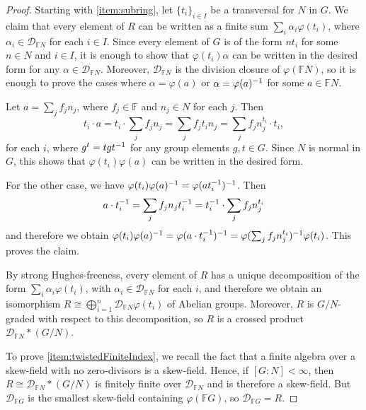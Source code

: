 \documentclass[11pt, letterpaper]{amsart}
\begin{document}
\begin{proof}

Starting with \ref{item:subring}, let $\{t_i\}_{i \in I}$ be a transversal for $N$ in $G$. We claim that every element of $R$ can be written as a finite sum $\sum_i \alpha_i \varphi(t_i)$, where $\alpha_i \in \mathcal{D}_{\mathbb{F}N}$ for each $i \in I$. Since every element of $G$ is of the  form $n t_i$ for some $n \in N$ and $i \in I$, it is enough to show that $\varphi(t_i) \alpha$ can be written in the desired form for any $\alpha \in \mathcal{D}_{\mathbb{F}N}$. Moreover, $\mathcal{D}_{\mathbb{F}N}$ is the division closure of $\varphi(\mathbb{F}N)$, so it is enough to prove the cases where $\alpha = \varphi(a)$ or $\alpha = \varphi(a)^{-1}$ for some $a \in \mathbb{F}N$.

Let $a = \sum_j f_j n_j$, where $f_j \in \mathbb{F}$ and $n_j \in N$ for each $j$. Then
\[
    t_i \cdot a = t_i \cdot \sum_j f_j n_j = \sum_j f_j t_i n_j = \sum_j f_j n_j^{t_i} \cdot t_i,
\]
for each $i$, where $g^t = t g t^{-1}$ for any group elements $g, t \in G$. Since $N$ is normal in $G$, this shows that $\varphi(t_i) \varphi(a)$ can be written in the desired form. 

For the other case, we have $\varphi(t_i) \varphi(a)^{-1} = \varphi(a t_i^{-1})^{-1}$. Then
\[
    a \cdot t_i^{-1} = \sum_j f_j n_j t_i^{-1} = t_i^{-1} \cdot \sum_j f_j n_j^{t_i}
\]
and therefore we obtain $\varphi(t_i) \varphi(a)^{-1} = \varphi(a \cdot t_i^{-1})^{-1} = \varphi(\sum_j f_j n_j^{t_i})^{-1} \varphi(t_i)$. This proves the claim.

By strong Hughes-freeness, every element of $R$ has a unique decomposition of the form $\sum_i \alpha_i \varphi(t_i)$, with $\alpha_i \in \mathcal{D}_{\mathbb{F}N}$ for each $i$, and therefore we obtain an isomorphism $R \cong \bigoplus_{i = 1}^n \mathcal{D}_{\mathbb{F}N} \varphi(t_i)$ of Abelian groups. Moreover, $R$ is $G/N$-graded with respect to this decomposition, so $R$ is a crossed product $\mathcal{D}_{\mathbb{F}N} * (G/N)$. 

\smallskip

To prove \ref{item:twistedFiniteIndex}, we recall the fact that a finite algebra over a skew-field with no zero-divisors is a skew-field. Hence, if $[G:N] < \infty$, then $R \cong \mathcal{D}_{\mathbb{F}N} * (G/N)$ is finitely finite over $\mathcal{D}_{\mathbb{F}N}$ and is therefore a skew-field. But $\mathcal{D}_{\mathbb{F}G}$ is the smallest skew-field containing $\varphi(\mathbb{F}G)$, so $\mathcal{D}_{\mathbb{F}G} = R$. \qedhere
\end{proof}
\end{document}
